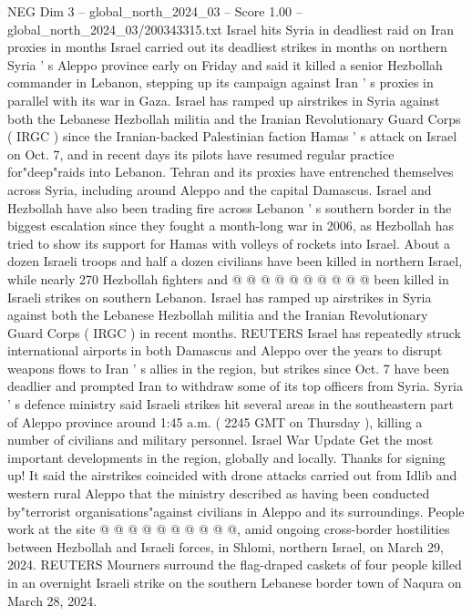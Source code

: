 \begin{textsample}{NEG Dim 3 – global\_north\_2024\_03 – Score 1.00 – global\_north\_2024\_03/200343315.txt}  \label{ex:f3_neg_164}
Israel hits Syria in deadliest raid on Iran proxies in months Israel carried out its deadliest strikes in months on northern Syria ' s Aleppo province early on Friday and said it killed a senior Hezbollah commander in Lebanon, stepping up its campaign against Iran ' s proxies in parallel with its war in Gaza.
Israel has ramped up airstrikes in Syria against both the Lebanese Hezbollah militia and the Iranian Revolutionary Guard Corps ( IRGC ) since the Iranian-backed Palestinian faction Hamas ' s attack on Israel on Oct. 7, and in recent days its pilots have resumed regular practice for"deep"raids into Lebanon.
Tehran and its proxies have entrenched themselves across Syria, including around Aleppo and the capital Damascus.
Israel and Hezbollah have also been trading fire across Lebanon ' s southern border in the biggest escalation since they fought a month-long war in 2006, as Hezbollah has tried to show its support for Hamas with volleys of rockets into Israel.
About a dozen Israeli troops and half a dozen civilians have been killed in northern Israel, while nearly 270 Hezbollah fighters and @ @ @ @ @ @ @ @ @ @ been killed in Israeli strikes on southern Lebanon.
Israel has ramped up airstrikes in Syria against both the Lebanese Hezbollah militia and the Iranian Revolutionary Guard Corps ( IRGC ) in recent months.
REUTERS Israel has repeatedly struck international airports in both Damascus and Aleppo over the years to disrupt weapons flows to Iran ' s allies in the region, but strikes since Oct. 7 have been deadlier and prompted Iran to withdraw some of its top officers from Syria.
Syria ' s defence ministry said Israeli strikes hit several areas in the southeastern part of Aleppo province around 1:45 a.m. ( 2245 GMT on Thursday ), killing a number of civilians and military personnel.
Israel War Update Get the most important developments in the region, globally and locally.
Thanks for signing up!
It said the airstrikes coincided with drone attacks carried out from Idlib and western rural Aleppo that the ministry described as having been conducted by"terrorist organisations"against civilians in Aleppo and its surroundings.
People work at the site @ @ @ @ @ @ @ @ @ @, amid ongoing cross-border hostilities between Hezbollah and Israeli forces, in Shlomi, northern Israel, on March 29, 2024.
REUTERS Mourners surround the flag-draped caskets of four people killed in an overnight Israeli strike on the southern Lebanese border town of Naqura on March 28, 2024.

\end{textsample}
